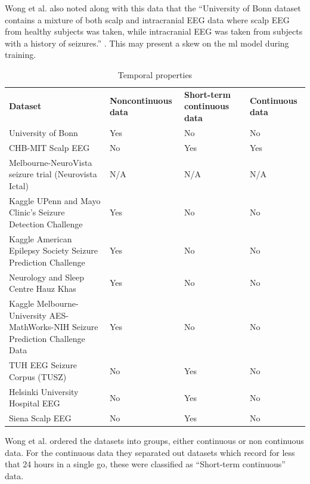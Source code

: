 \documentclass[12pt]{article}
\begin{document}
Wong et al. also noted along with this data that the ``University of Bonn dataset contains a mixture of both scalp and intracranial EEG data where scalp EEG from healthy subjects was taken, while intracranial EEG was taken from subjects with a history of seizures.'' \cite{wong2023eeg}. This may present a skew on the \acrshort{ml} model during training.


\begin{table}[H]
\centering
\begin{tabular}{p{}p{}p{}p{}}
  \textbf{Dataset} &
  \textbf{Noncontinuous data} &
  \textbf{Short-term continuous data} &
  \textbf{Continuous data} \\
  
University of Bonn                                                              & Yes & No  & No  \\
CHB-MIT Scalp EEG                                                               & No  & Yes & Yes \\
Melbourne-NeuroVista seizure trial (Neurovista Ictal)                           & N/A & N/A & N/A \\
Kaggle UPenn and Mayo Clinic's Seizure Detection Challenge                      & Yes & No  & No  \\
Kaggle American Epilepsy Society Seizure Prediction Challenge                   & Yes & No  & No  \\
Neurology and Sleep Centre Hauz Khas                                            & Yes & No  & No  \\
Kaggle Melbourne-University AES-MathWorks-NIH Seizure Prediction Challenge Data & Yes & No  & No  \\
TUH EEG Seizure Corpus (TUSZ)                                                   & No  & Yes & No  \\
Helsinki University Hospital EEG                                                & No  & Yes & No  \\
Siena Scalp EEG                                                                 & No  & Yes & No 
\end{tabular}
\caption{Temporal properties}
\end{table}

Wong et al. ordered the datasets into groups, either continuous or non continuous data. For the continuous data they separated out datasets which record for less that 24 hours in a single go, these were classified as ``Short-term continuous'' data.
\end{document}

